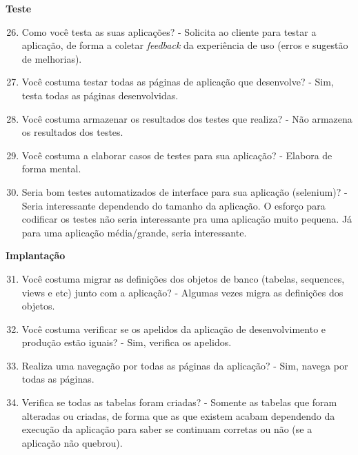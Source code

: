 \begin{anexosenv}
\textbf{Teste}

\begin{enumerate}
\setcounter{enumi}{25}
\item Como você testa as suas aplicações?\newline
- Solicita ao cliente para testar a aplicação, de forma a coletar \textit{feedback} da experiência de uso (erros e sugestão de melhorias).
\item Você costuma testar todas as páginas de aplicação que desenvolve?\newline
- Sim, testa todas as páginas desenvolvidas.
\item Você costuma armazenar os resultados dos testes que realiza?\newline
- Não armazena os resultados dos testes.
\item Você costuma a elaborar casos de testes para sua aplicação?\newline
- Elabora de forma mental.
\item Seria bom testes automatizados de interface para sua aplicação (selenium)?\newline
- Seria interessante dependendo do tamanho da aplicação. O esforço para codificar os testes não seria interessante pra uma aplicação muito pequena. Já para uma aplicação média/grande, seria interessante.
\end{enumerate}

\textbf{Implantação}

\begin{enumerate}
\setcounter{enumi}{30}
\item Você costuma migrar as definições dos objetos de banco (tabelas, sequences, views e
etc) junto com a aplicação?\newline
- Algumas vezes migra as definições dos objetos.
\item Você costuma verificar se os apelidos da aplicação de desenvolvimento e produção
estão iguais?\newline
- Sim, verifica os apelidos.
\item Realiza uma navegação por todas as páginas da aplicação?\newline
- Sim, navega por todas as páginas.
\item Verifica se todas as tabelas foram criadas?\newline
- Somente as tabelas que foram alteradas ou criadas, de forma que as que existem acabam dependendo da execução da aplicação para saber se continuam corretas ou não (se a aplicação não quebrou).
\end{enumerate}


\end{anexosenv}
